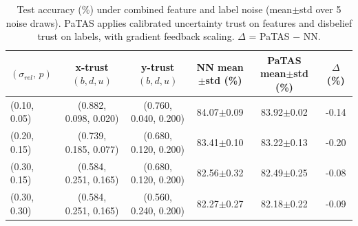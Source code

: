 \begin{table}[ht]
\centering
\caption{Test accuracy (\%) under combined feature and label noise (mean$\pm$std over 5 noise draws). PaTAS applies calibrated uncertainty trust on features and disbelief trust on labels, with gradient feedback scaling. $\Delta$ = PaTAS $-$ NN.}
\label{tab:combined-noise}
\begin{tabular}{lccccc}
\toprule
$(\sigma_{rel},\, p)$ & x-trust $(b,d,u)$ & y-trust $(b,d,u)$ & NN mean$\pm$std (\%) & PaTAS mean$\pm$std (\%) & $\Delta$ (\%) \\
\midrule
(0.10, 0.05) & (0.882, 0.098, 0.020) & (0.760, 0.040, 0.200) & 84.07$\pm$0.09 & 83.92$\pm$0.02 & -0.14 \\
(0.20, 0.15) & (0.739, 0.185, 0.077) & (0.680, 0.120, 0.200) & 83.41$\pm$0.10 & 83.22$\pm$0.13 & -0.20 \\
(0.30, 0.15) & (0.584, 0.251, 0.165) & (0.680, 0.120, 0.200) & 82.56$\pm$0.32 & 82.49$\pm$0.25 & -0.08 \\
(0.30, 0.30) & (0.584, 0.251, 0.165) & (0.560, 0.240, 0.200) & 82.27$\pm$0.27 & 82.18$\pm$0.22 & -0.09 \\
\bottomrule
\end{tabular}
\end{table}